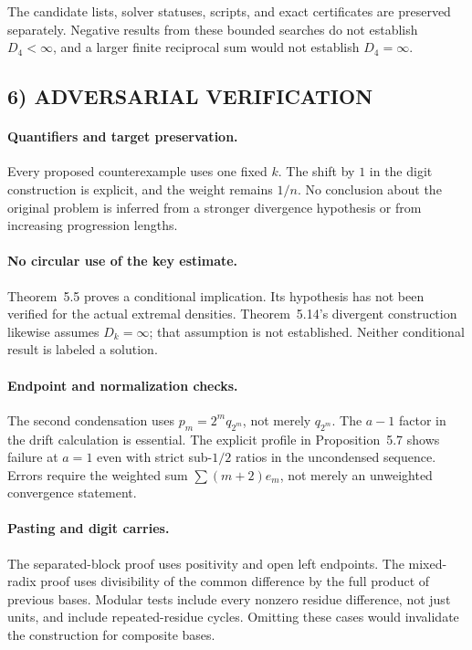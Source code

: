 The candidate lists, solver statuses, scripts, and exact certificates are preserved separately. Negative results from these bounded searches do not establish $D_4<\infty$, and a larger finite reciprocal sum would not establish $D_4=\infty$.

\subsection{6) ADVERSARIAL VERIFICATION}

\paragraph{Quantifiers and target preservation.}
Every proposed counterexample uses one fixed $k$. The shift by $1$ in the digit construction is explicit, and the weight remains $1/n$. No conclusion about the original problem is inferred from a stronger divergence hypothesis or from increasing progression lengths.

\paragraph{No circular use of the key estimate.}
Theorem~5.5 proves a conditional implication. Its hypothesis has not been verified for the actual extremal densities. Theorem~5.14's divergent construction likewise assumes $D_k=\infty$; that assumption is not established. Neither conditional result is labeled a solution.

\paragraph{Endpoint and normalization checks.}
The second condensation uses $p_m=2^mq_{2^m}$, not merely $q_{2^m}$. The $a-1$ factor in the drift calculation is essential. The explicit profile in Proposition~5.7 shows failure at $a=1$ even with strict sub-$1/2$ ratios in the uncondensed sequence. Errors require the weighted sum $\sum(m+2)e_m$, not merely an unweighted convergence statement.

\paragraph{Pasting and digit carries.}
The separated-block proof uses positivity and open left endpoints. The mixed-radix proof uses divisibility of the common difference by the full product of previous bases. Modular tests include every nonzero residue difference, not just units, and include repeated-residue cycles. Omitting these cases would invalidate the construction for composite bases.

